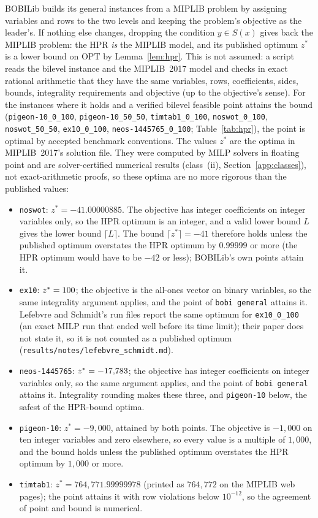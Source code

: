 BOBILib builds its general instances from a MIPLIB problem by assigning
variables and rows to the two levels and keeping the problem's objective as
the leader's. If nothing else changes, dropping the condition $y\in S(x)$
gives back the MIPLIB problem: the HPR \emph{is} the MIPLIB model, and its
published optimum\cite{gleixner2021miplib} $z^{*}$ is a lower bound on $\mathrm{OPT}$ by
Lemma~\ref{lem:hpr}. This is not assumed: a script reads the bilevel
instance and the MIPLIB~2017 model and checks in exact rational arithmetic
that they have the same variables, rows, coefficients, sides, bounds,
integrality requirements and objective (up to the objective's sense). For
the \NumHprOptimal{} instances where it holds and a verified bilevel feasible point
attains the bound (\texttt{pigeon-10\_0\_100}, \texttt{pigeon-10\_50\_50},
\texttt{timtab1\_0\_100}, \texttt{noswot\_0\_100}, \texttt{noswot\_50\_50},
\texttt{ex10\_0\_100}, \texttt{neos-1445765\_0\_100}; Table~\ref{tab:hpr}),
the point is optimal by accepted benchmark conventions. The values $z^{*}$
are the optima in MIPLIB~2017's solution file. They were computed by MILP
solvers in floating point and are solver-certified numerical results
(class~(ii), Section~\ref{app:classes}), not exact-arithmetic proofs, so these
optima are no more rigorous than the published values:
\begin{itemize}
\item \texttt{noswot}: $z^{*}=-41.00000885$. The objective has integer
coefficients on integer variables only, so the HPR optimum is an integer, and
a valid lower bound $L$ gives the lower bound $\lceil L\rceil$. The bound
$\lceil z^{*}\rceil=-41$ therefore holds unless the published optimum
overstates the HPR optimum by $0.99999$ or more (the HPR optimum would have to
be $-42$ or less); BOBILib's own points attain it.
\item \texttt{ex10}: $z^{*}=100{}$; the objective is the all-ones vector on
binary variables, so the same integrality argument applies, and the point of
\texttt{bobi general} attains it. Lefebvre and Schmidt's run
files\cite{lefebvre2025dantzig} report the same optimum for \texttt{ex10\_0\_100}
(an exact MILP run that ended well before its time limit); their paper does not state
it, so it is not counted as a published optimum
(\texttt{results/notes/lefebvre\_schmidt.md}).
\item \texttt{neos-1445765}: $z^{*}=-17{,}783{}$; the objective has integer
coefficients on integer variables only, so the same argument applies, and the point
of \texttt{bobi general} attains it.
Integrality rounding makes these three, and \texttt{pigeon-10} below, the
safest of the HPR-bound optima.
\item \texttt{pigeon-10}: $z^{*}=-9{,}000$, attained by both points. The
objective is $-1{,}000$ on ten integer variables and zero elsewhere, so every
value is a multiple of $1{,}000$, and the bound holds unless the published
optimum overstates the HPR optimum by $1{,}000$ or more.
\item \texttt{timtab1}: $z^{*}=764{,}771.99999978$ (printed as $764{,}772$ on
the MIPLIB web pages); the point attains it with row violations below
$10^{-12}$, so the agreement of point and bound is numerical.
\end{itemize}
